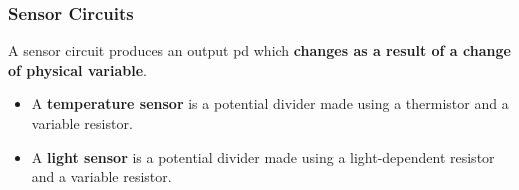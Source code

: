 \subsubsection*{Sensor Circuits}

A sensor circuit produces an output pd which \textbf{changes as a result of a change of physical variable}.
\begin{itemize}
    \item A \textbf{temperature sensor} is a potential divider made using a thermistor and a variable resistor.
    \item A \textbf{light sensor} is a potential divider made using a light-dependent resistor and a variable resistor.
\end{itemize}
